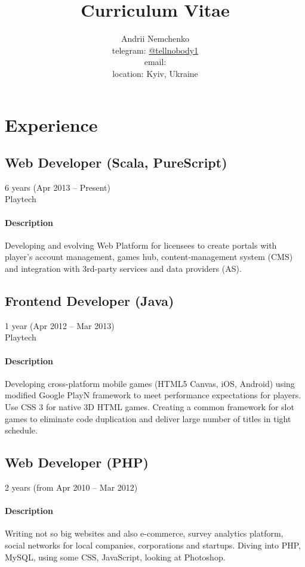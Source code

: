 \documentclass{article}
\begin{document}
\title{Curriculum Vitae}
\author{
  Andrii Nemchenko\\
  telegram: \href{https://t.me/tellnobody1}{@tellnobody1}\\
  email: \\
  location: Kyiv, Ukraine
}
\maketitle
\section{Experience}
\subsection{Web Developer (Scala, PureScript)}
6 years (Apr 2013 – Present)\\
Playtech
\paragraph{Description}
Developing and evolving Web Platform for licensees to create portals with player's account management, games hub, content-management system (CMS) and integration with 3rd-party services and data providers (AS).
\subsection{Frontend Developer (Java)}
1 year (Apr 2012 – Mar 2013)\\Playtech
\paragraph{Description}
Developing cross-platform mobile games (HTML5 Canvas, iOS, Android) using modified Google PlayN framework to meet performance expectations for players. Use CSS 3 for native 3D HTML games. Creating a common framework for slot games to eliminate code duplication and deliver large number of titles in tight schedule.
\subsection{Web Developer (PHP)}
2 years (from Apr 2010 – Mar 2012)
\paragraph{Description}
Writing not so big websites and also e-commerce, survey analytics platform, social networks for local companies, corporations and startups. Diving into PHP, MySQL, using some CSS, JavaScript, looking at Photoshop.
\end{document}
